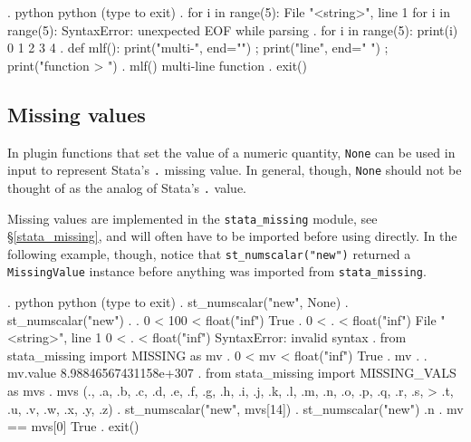 \documentclass{article}
\begin{document}
\smallskip

\begin{stlog}
. python
 python (type {} to exit) 
. for i in range(5):
{\color{red}  File "<string>", line 1
    for i in range(5):
                     {\caret}
SyntaxError: unexpected EOF while parsing}
{\smallskip}
. for i in range(5): print(i)
0
1
2
3
4
{\smallskip}
. def mlf(): print("multi-", end="") ; print("line", end=" ") ; print("function
> ")
{\smallskip}
. mlf()
multi-line function
{\smallskip}
. exit()
\end{stlog}

\smallskip



\subsection{Missing values} \label{missing_value_example}

In plugin functions that set the value of a numeric quantity, \lstinline$None$ can be used in input to represent Stata's \lstinline$.$ missing value. In general, though, \lstinline$None$ should not be thought of as the analog of Stata's \lstinline{.} value.

Missing values are implemented in the \lstinline$stata_missing$ module, see \S\ref{stata_missing}, and will often have to be imported before using directly. In the following example, though, notice that \lstinline{st_numscalar("new")} returned a \lstinline{MissingValue} instance before anything was imported from \lstinline{stata_missing}.

\smallskip

\begin{stlog}
. python
 python (type {} to exit) 
. st_numscalar("new", None)
{\smallskip}
. st_numscalar("new")
.
{\smallskip}
. 0 < 100 < float("inf")
True
{\smallskip}
. 0 < . < float("inf")
{\color{red}  File "<string>", line 1
    0 < . < float("inf")
        {\caret}
SyntaxError: invalid syntax}
{\smallskip}
. from stata_missing import MISSING as mv
{\smallskip}
. 0 < mv < float("inf")
True
{\smallskip}
. mv
.
{\smallskip}
. mv.value
8.98846567431158e+307
{\smallskip}
. from stata_missing import MISSING_VALS as mvs
{\smallskip}
. mvs
(., .a, .b, .c, .d, .e, .f, .g, .h, .i, .j, .k, .l, .m, .n, .o, .p, .q, .r, .s,
>  .t, .u, .v, .w, .x, .y, .z)
{\smallskip}
. st_numscalar("new", mvs[14])
{\smallskip}
. st_numscalar("new")
.n
{\smallskip}
. mv == mvs[0]
True
{\smallskip}
. exit()
\end{stlog}
\end{document}
